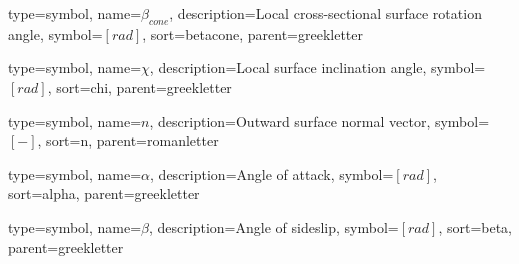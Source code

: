 {
	type=symbol, %
	name={\ensuremath{\beta_{cone}}}, %
	description={Local cross-sectional surface rotation angle}, %
	symbol={$\left[rad \right]$}, %
	sort=betacone, %
	parent=greekletter %
}

{
	type=symbol, %
	name={\ensuremath{\chi}}, %
	description={Local surface inclination angle}, %
	symbol={$\left[rad \right]$}, %
	sort=chi, %
	parent=greekletter %
}

{
	type=symbol, %
	name={\ensuremath{n}}, %
	description={Outward surface normal vector}, %
	symbol={$\left[- \right]$}, %
	sort=n, %
	parent=romanletter %
}

{
	type=symbol, %
	name={\ensuremath{\alpha}}, %
	description={Angle of attack}, %
	symbol={$\left[rad \right]$}, %
	sort=alpha, %
	parent=greekletter %
}

{
	type=symbol, %
	name={\ensuremath{\beta}}, %
	description={Angle of sideslip}, %
	symbol={$\left[rad \right]$}, %
	sort=beta, %
	parent=greekletter %
}

